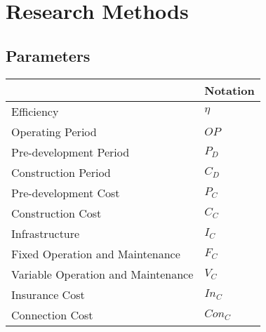 \documentclass[sigconf]{acmart}
\begin{document}
%



% 
\appendix

\section{Research Methods}

\subsection{Parameters}

\begin{table}[]
	\begin{tabular}{|l|l|}
		\hline
		\textbf{} & \textbf{Notation} \\ \hline
		Efficiency & $\eta$ \\ \hline
		Operating Period & $OP$ \\ \hline
		Pre-development Period & $P_D$ \\ \hline
		Construction Period & $C_D$ \\ \hline
		Pre-development Cost & $P_C$ \\ \hline
		Construction Cost & $C_C$ \\ \hline
		Infrastructure & $I_C$ \\ \hline
		Fixed Operation and Maintenance & $F_C$ \\ \hline
		Variable Operation and Maintenance & $V_C$ \\ \hline
		Insurance Cost & $In_C$ \\ \hline
		Connection Cost & $Con_C$ \\ \hline
	\end{tabular}
\end{table}
\end{document}
